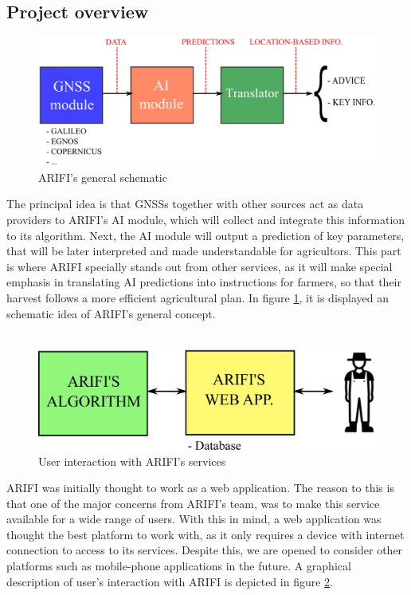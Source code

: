 \subsection{Project overview}
%
\begin{figure}[b!]
    \centering
    \includegraphics[scale= 0.26]{images/dibujo1.eps}
    \caption{ARIFI's general schematic}
    \label{fig:sch1}
\end{figure}
%
The principal idea is that GNSSs together with other sources act as data providers to ARIFI's AI module, which will collect and integrate this information to its algorithm. Next, the AI module will output a prediction of key parameters, that will be later interpreted and made understandable for agricultors. This part is where ARIFI specially stands out from other services, as it will make special emphasis in translating AI predictions into instructions for farmers, so that their harvest follows a more efficient agricultural plan. In figure \ref{fig:sch1}, it is displayed an schematic idea of ARIFI's general concept.\\\\
%
\begin{figure}[t!]
    \centering
    \includegraphics[scale= 0.20]{images/dibujo2.eps}
    \caption{User interaction with ARIFI's services}
    \label{fig:sch2}
\end{figure}
%
ARIFI was initially thought to work as a web application. The reason to this is that one of the major concerns from ARIFI's team, was to make this service available for a wide range of users. With this in mind, a web application was thought the best platform to work with, as it only requires a device with internet connection to access to its services. Despite this, we are opened to consider other platforms such as mobile-phone applications in the future. A graphical description of user's interaction with ARIFI is depicted in figure \ref{fig:sch2}.
